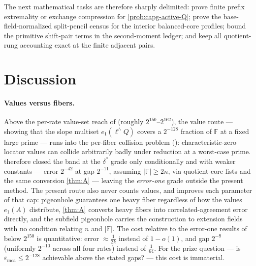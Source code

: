 \documentclass[11pt]{article}
\theoremstyle{definition}
\theoremstyle{remark}
\newcommand{\F}{\mathbb{F}}
\newcommand{\emca}{\varepsilon_{\mathrm{mca}}}
\newcommand{\eone}{e_1}
\begin{document}
The next mathematical tasks are therefore sharply delimited: prove finite
prefix extremality or exchange compression for \cref{prob:capg-active-Q}; prove
the base-field-normalized split-pencil census for the interior balanced-core
profiles; bound the primitive shift-pair terms in the second-moment ledger;
and keep all quotient-rung accounting exact at the finite adjacent pairs.



\section{Discussion}\label{sec:discussion}

\paragraph{Values versus fibers.}
Above the per-rate value-set reach of \cite{Cho26b} (roughly $2^{150}$--$2^{162}$), the value route --- showing that the slope multiset $\eone(\ell^\wedge Q)$ covers a $2^{-128}$ fraction of $\F$ at a fixed large prime --- runs into the per-fiber collision problem (\cite[Rem.\ ``The remaining band'']{Cho26b}): characteristic-zero locator values can collide arbitrarily badly under reduction at a worst-case prime. \cite{Cho26b} therefore closed the band at the $\delta^*$ grade only conditionally and with weaker constants --- error $2^{-42}$ at gap $2^{-11}$, assuming $|\F|\ge2n$, via quotient-core lists and the same conversion \cref{thm:A} --- leaving the \emph{error-one} grade outside the present method. The present route also never counts values, and improves each parameter of that cap: pigeonhole guarantees one heavy fiber regardless of how the values $\eone(A)$ distribute, \cref{thm:A} converts heavy fibers into correlated-agreement error directly, and the subfield pigeonhole carries the construction to extension fields with no condition relating $n$ and $|\F|$. The cost relative to the error-one results of \cite{Cho26a,Cho26b} below $2^{150}$ is quantitative: error $\approx\frac1{2k}$ instead of $1-o(1)$, and gap $2^{-9}$ (uniformly $2^{-10}$ across all four rates) instead of $\frac1{64}$. For the prize question --- is $\emca\le2^{-128}$ achievable above the stated gaps? --- this cost is immaterial.
\end{document}
